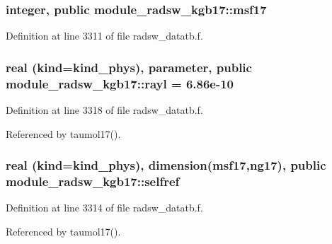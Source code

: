 \subsubsection[{\texorpdfstring{msf17}{msf17}}]{\setlength{\rightskip}{0pt plus 5cm}integer, public module\+\_\+radsw\+\_\+kgb17\+::msf17}\hypertarget{namespacemodule__radsw__kgb17_a6864c3b95515fb2f408e21298da3952f}{}\label{namespacemodule__radsw__kgb17_a6864c3b95515fb2f408e21298da3952f}


Definition at line 3311 of file radsw\+\_\+datatb.\+f.

\subsubsection[{\texorpdfstring{rayl}{rayl}}]{\setlength{\rightskip}{0pt plus 5cm}real (kind=kind\+\_\+phys), parameter, public module\+\_\+radsw\+\_\+kgb17\+::rayl = 6.\+86e-\/10}\hypertarget{namespacemodule__radsw__kgb17_aa4862628a06e0e08d1db5637bc62ffa5}{}\label{namespacemodule__radsw__kgb17_aa4862628a06e0e08d1db5637bc62ffa5}


Definition at line 3318 of file radsw\+\_\+datatb.\+f.



Referenced by taumol17().

\subsubsection[{\texorpdfstring{selfref}{selfref}}]{\setlength{\rightskip}{0pt plus 5cm}real (kind=kind\+\_\+phys), dimension({\bf msf17},ng17), public module\+\_\+radsw\+\_\+kgb17\+::selfref}\hypertarget{namespacemodule__radsw__kgb17_aade34dfbe8c5f380088b6e03acc727c9}{}\label{namespacemodule__radsw__kgb17_aade34dfbe8c5f380088b6e03acc727c9}


Definition at line 3314 of file radsw\+\_\+datatb.\+f.



Referenced by taumol17().

